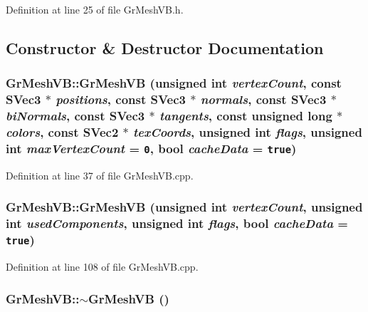 Definition at line 25 of file GrMeshVB.h.

\subsection{Constructor \& Destructor Documentation}
\hypertarget{class_gr_mesh_v_b_0d3edf08e72919b89d6a1195459dcd4f}{
\subsubsection[{GrMeshVB}]{\setlength{\rightskip}{0pt plus 5cm}GrMeshVB::GrMeshVB (unsigned int {\em vertexCount}, \/  const {\bf SVec3} $\ast$ {\em positions}, \/  const {\bf SVec3} $\ast$ {\em normals}, \/  const {\bf SVec3} $\ast$ {\em biNormals}, \/  const {\bf SVec3} $\ast$ {\em tangents}, \/  const unsigned long $\ast$ {\em colors}, \/  const {\bf SVec2} $\ast$ {\em texCoords}, \/  unsigned int {\em flags}, \/  unsigned int {\em maxVertexCount} = {\tt 0}, \/  bool {\em cacheData} = {\tt true})}}
\label{class_gr_mesh_v_b_0d3edf08e72919b89d6a1195459dcd4f}




Definition at line 37 of file GrMeshVB.cpp.\hypertarget{class_gr_mesh_v_b_fcd057b800d11fa70e1fd977df27d278}{
\subsubsection[{GrMeshVB}]{\setlength{\rightskip}{0pt plus 5cm}GrMeshVB::GrMeshVB (unsigned int {\em vertexCount}, \/  unsigned int {\em usedComponents}, \/  unsigned int {\em flags}, \/  bool {\em cacheData} = {\tt true})}}
\label{class_gr_mesh_v_b_fcd057b800d11fa70e1fd977df27d278}




Definition at line 108 of file GrMeshVB.cpp.\hypertarget{class_gr_mesh_v_b_f6686b7165c23fc5236d81ecb715e1ed}{
\subsubsection[{$\sim$GrMeshVB}]{\setlength{\rightskip}{0pt plus 5cm}GrMeshVB::$\sim$GrMeshVB ()}}
\label{class_gr_mesh_v_b_f6686b7165c23fc5236d81ecb715e1ed}





